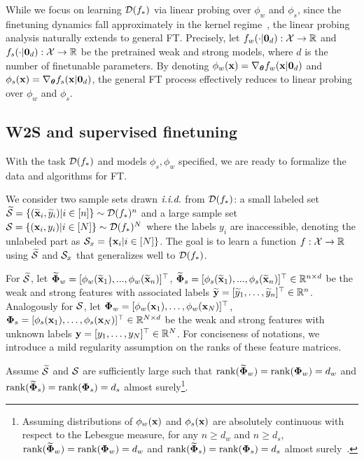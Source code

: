 \begin{remark}\label{rmk:lp_to_general_ft}
    While we focus on learning $\mathcal{D}(f_*)$ via linear probing over $\phi_w$ and $\phi_s$, since the finetuning dynamics fall approximately in the kernel regime~\citep{wei2022more,malladi2023kernel}, the linear probing analysis naturally extends to general FT. 
    Precisely, let $f_w(\cdot | \textbf0_d): \mathcal{X} \to \mathbb{R}$ and $f_s(\cdot | \textbf0_d): \mathcal{X} \to \mathbb{R}$ be the pretrained weak and strong models, where $d$ is the number of finetunable parameters. By denoting $\phi_w(\mathbf{x}) = \nabla_{\boldsymbol{\theta}} f_w(\mathbf{x} | \textbf0_d)$ and $\phi_s(\mathbf{x}) = \nabla_{\boldsymbol{\theta}} f_s(\mathbf{x} | \textbf0_d)$, the general FT process effectively reduces to linear probing over $\phi_w$ and $\phi_s$.
\end{remark}



\subsection{W2S and supervised finetuning}\label{sec:ft_algorithms}
With the task $\mathcal{D}(f_*)$ and models $\phi_s, \phi_w$ specified, we are ready to formalize the data and algorithms for FT.

We consider two sample sets drawn $\emph{i.i.d.}$ from $\mathcal{D}(f_*)$: a small labeled set $\widetilde{{\mathcal{S}}} = \left\{(\widetilde{\mathbf{x}}_i,\widetilde{y}_i) \middle\vert i \in [n] \right\} \sim \mathcal{D}(f_*)^n$ and a large sample set ${\mathcal{S}} = \left\{(\mathbf{x}_i, y_i) \middle\vert i \in [N] \right\} \sim \mathcal{D}(f_*)^N$ where the labels $y_i$ are inaccessible, denoting the unlabeled part as ${\mathcal{S}}_x = \left\{\mathbf{x}_i \middle\vert i \in [N] \right\}$.
The goal is to learn a function $f: \mathcal{X} \to \mathbb{R}$ using $\widetilde{{\mathcal{S}}}$ and ${\mathcal{S}}_x$ that generalizes well to $\mathcal{D}(f_*)$.

For $\widetilde{{\mathcal{S}}}$, let $\widetilde{\boldsymbol{\Phi}}_w = [\phi_w(\widetilde{\mathbf{x}}_1),...,\phi_w(\widetilde{\mathbf{x}}_n)]^\top$, $\widetilde{\boldsymbol{\Phi}}_s = [\phi_s(\widetilde{\mathbf{x}}_1),...,\phi_s(\widetilde{\mathbf{x}}_n)]^\top \in \mathbb{R}^{n \times d}$ be the weak and strong features with associated labels $\widetilde{\mathbf{y}} = [\widetilde{y}_1, \ldots, \widetilde{y}_n]^\top \in \mathbb{R}^n$. 
Analogously for ${\mathcal{S}}$, let $\boldsymbol{\Phi}_w = [\phi_w(\mathbf{x}_1), \ldots, \phi_w(\mathbf{x}_N)]^\top$, $\boldsymbol{\Phi}_s = [\phi_s(\mathbf{x}_1), \ldots, \phi_s(\mathbf{x}_N)]^\top \in \mathbb{R}^{N \times d}$ be the weak and strong features with unknown labels $\mathbf{y} = [y_1, \ldots, y_N]^\top \in \mathbb{R}^N$.
For conciseness of notations, we introduce a mild regularity assumption on the ranks of these feature matrices.
\begin{assumption}\label{asm:ft_data}
    Assume $\widetilde{{\mathcal{S}}}$ and ${\mathcal{S}}$ are sufficiently large such that $\mathop{\mathrm{rank}}(\widetilde{\boldsymbol{\Phi}}_w) = \mathop{\mathrm{rank}}(\boldsymbol{\Phi}_w) = d_w$ and $\mathop{\mathrm{rank}}(\widetilde{\boldsymbol{\Phi}}_s) = \mathop{\mathrm{rank}}(\boldsymbol{\Phi}_s) = d_s$ almost surely\footnote{
        Assuming distributions of $\phi_w(\mathbf{x})$ and $\phi_s(\mathbf{x})$ are absolutely continuous with respect to the Lebesgue measure, for any $n \ge d_w$ and $n \ge d_s$, $\mathop{\mathrm{rank}}(\widetilde{\boldsymbol{\Phi}}_w)=\mathop{\mathrm{rank}}(\boldsymbol{\Phi}_w)=d_w$ and $\mathop{\mathrm{rank}}(\widetilde{\boldsymbol{\Phi}}_s)=\mathop{\mathrm{rank}}(\boldsymbol{\Phi}_s)=d_s$ almost surely~\citep[\S 3.3.1]{vershynin2018high}.
    }.
\end{assumption}

